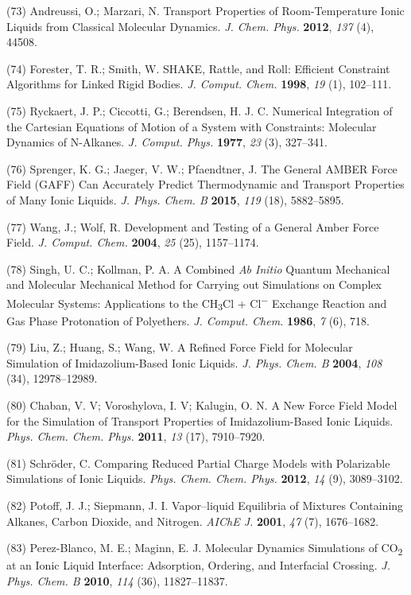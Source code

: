 \documentclass[]{article}
\begin{document}
(73) Andreussi, O.; Marzari, N. Transport Properties of Room-Temperature
Ionic Liquids from Classical Molecular Dynamics. \emph{J. Chem. Phys.}
\textbf{2012}, \emph{137} (4), 44508.

(74) Forester, T. R.; Smith, W. SHAKE, Rattle, and Roll: Efficient
Constraint Algorithms for Linked Rigid Bodies. \emph{J. Comput. Chem.}
\textbf{1998}, \emph{19} (1), 102--111.

(75) Ryckaert, J. P.; Ciccotti, G.; Berendsen, H. J. C. Numerical
Integration of the Cartesian Equations of Motion of a System with
Constraints: Molecular Dynamics of N-Alkanes. \emph{J. Comput. Phys.}
\textbf{1977}, \emph{23} (3), 327--341.

(76) Sprenger, K. G.; Jaeger, V. W.; Pfaendtner, J. The General AMBER
Force Field (GAFF) Can Accurately Predict Thermodynamic and Transport
Properties of Many Ionic Liquids. \emph{J. Phys. Chem. B} \textbf{2015},
\emph{119} (18), 5882--5895.

(77) Wang, J.; Wolf, R. Development and Testing of a General Amber Force
Field. \emph{J. Comput. Chem.} \textbf{2004}, \emph{25} (25),
1157--1174.

(78) Singh, U. C.; Kollman, P. A. A Combined \emph{Ab Initio} Quantum
Mechanical and Molecular Mechanical Method for Carrying out Simulations
on Complex Molecular Systems: Applications to the CH\textsubscript{3}Cl
+ Cl\textsuperscript{−} Exchange Reaction and Gas Phase Protonation of
Polyethers. \emph{J. Comput. Chem.} \textbf{1986}, \emph{7} (6), 718.

(79) Liu, Z.; Huang, S.; Wang, W. A Refined Force Field for Molecular
Simulation of Imidazolium-Based Ionic Liquids. \emph{J. Phys. Chem. B}
\textbf{2004}, \emph{108} (34), 12978--12989.

(80) Chaban, V. V; Voroshylova, I. V; Kalugin, O. N. A New Force Field
Model for the Simulation of Transport Properties of Imidazolium-Based
Ionic Liquids. \emph{Phys. Chem. Chem. Phys.} \textbf{2011}, \emph{13}
(17), 7910--7920.

(81) Schröder, C. Comparing Reduced Partial Charge Models with
Polarizable Simulations of Ionic Liquids. \emph{Phys. Chem. Chem. Phys.}
\textbf{2012}, \emph{14} (9), 3089--3102.

(82) Potoff, J. J.; Siepmann, J. I. Vapor--liquid Equilibria of Mixtures
Containing Alkanes, Carbon Dioxide, and Nitrogen. \emph{AIChE J.}
\textbf{2001}, \emph{47} (7), 1676--1682.

(83) Perez-Blanco, M. E.; Maginn, E. J. Molecular Dynamics Simulations
of CO\textsubscript{2} at an Ionic Liquid Interface: Adsorption,
Ordering, and Interfacial Crossing. \emph{J. Phys. Chem. B}
\textbf{2010}, \emph{114} (36), 11827--11837.
\end{document}
